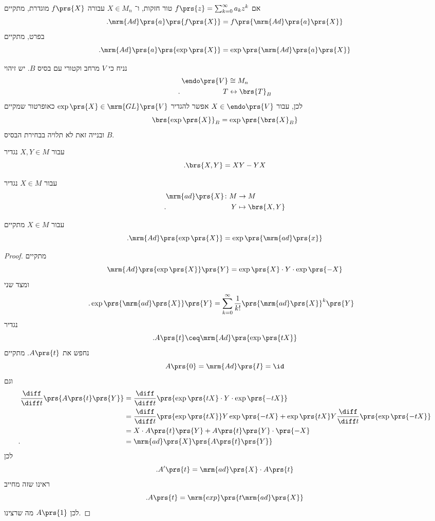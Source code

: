 \documentclass[10pt, twoside]{book}
\begin{document}
\begin{exercise}
אם
$f\prs{z} = \sum_{k=0}^{\infty} a_k z^k$
טור חזקות, ו־%
$X \in M_n$
עבורה
$f\prs{X}$
מוגדרת, מתקיים
\[\text{.} \mrm{Ad}\prs{a} \prs{f\prs{X}} = f\prs{\mrm{Ad}\prs{a}\prs{X}}\]
בפרט, מתקיים
\[\text{.} \mrm{Ad}\prs{a} \prs{\exp\prs{X}} = \exp\prs{\mrm{Ad}\prs{a}\prs{X}}\]
\end{exercise}

\begin{corollary}
נניח כי
$V$
מרחב וקטורי עם בסיס
$B$.
יש זיהוי
\begin{align*}
\endo\prs{V} &\cong M_n \\
\text{.} \hphantom{\endo\prs{.}} T &\leftrightarrow \brs{T}_B
\end{align*}
לכן, עבור
$X \in \endo\prs{V}$
אפשר להגדיר
$\exp\prs{X} \in \mrm{GL}\prs{V}$
כאופרטור שמקיים
\[\brs{\exp\prs{X}}_B = \exp\prs{\brs{X}_B}\]
ובנייה זאת לא תלויה בבחירת הבסיס
$B$.
\end{corollary}

\begin{definition}[הקומוטטור]
עבור
$X,Y \in M$
נגדיר
\[\text{.} \brs{X,Y} = XY - YX\]
\end{definition}

\begin{definition}
עבור
$X \in M$
נגדיר
\begin{align*}
\mrm{ad}\prs{X} \colon M &\to M \\
\text{.} \hphantom{\mrm{ad}\prs{.} aaa} Y &\mapsto \brs{X,Y}
\end{align*}
\end{definition}

\begin{proposition}
עבור
$X \in M$
מתקיים
\[\text{.} \mrm{Ad}\prs{\exp\prs{X}} = \exp\prs{\mrm{ad}\prs{x}}\]
\end{proposition}

\begin{proof}
מתקיים
\[\mrm{Ad}\prs{\exp\prs{X}}\prs{Y} = \exp\prs{X} \cdot Y \cdot \exp\prs{-X}\]
ומצד שני
\begin{align*}
\text{.} \exp\prs{\mrm{ad}\prs{X}}\prs{Y} &= \sum_{k=0}^{\infty} \frac{1}{k!} \prs{\mrm{ad}\prs{X}}^k \prs{Y}
\end{align*}
נגדיר
\[\text{.} A\prs{t} \ceq \mrm{Ad}\prs{\exp\prs{tX}}\]
נחפש את
$A\prs{t}$.
מתקיים
\[A\prs{0} = \mrm{Ad}\prs{I} = \id\]
וגם
\begin{align*}
\frac{\diff}{\diff t}\prs{A\prs{t}\prs{Y}}
&=
\frac{\diff}{\diff t} \prs{\exp\prs{tX} \cdot Y \cdot \exp\prs{-tX}}
\\&=
\frac{\diff}{\diff t}\prs{\exp\prs{tX}} Y \exp\prs{-tX} + \exp\prs{tX}Y \frac{\diff}{\diff t} \prs{\exp\prs{-tX}}
\\&=
X \cdot A\prs{t}\prs{Y} + A\prs{t}\prs{Y} \cdot \prs{-X}
\\ \text{.} \hphantom{\frac{\diff}{\diff t}\prs{A\prs{t}\prs{Y}}} &= \mrm{ad}\prs{X} \prs{A\prs{t} \prs{Y}}
\end{align*}
לכן
\[\text{.} A'\prs{t} = \mrm{ad}\prs{X} \cdot A\prs{t}\]
ראינו שזה מחייב
\[\text{.} A\prs{t} = \mrm{exp}\prs{t \mrm{ad}\prs{X}}\]
לכן
$A\prs{1}$
מה שרצינו.
\end{proof}
\end{document}
